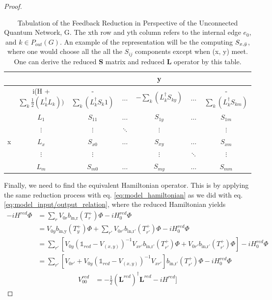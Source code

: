 \documentclass[a4paper]{article}
\theoremstyle{definition}
\begin{document}
\begin{enumerate}[label=(\roman*)]
\begin{proof}
\begin{table}[H]
    \centering
    \begin{tabular}{c|c c c|c|c c}
         & & & & y & & \\ \hline
         & i(H + $\sum_k \frac{1}{2}(L_k^\dagger L_k))$ & -$\sum_k (L_k^\dagger {S_k1})$ & $\dots$ & $-\sum_k (L_k^\dagger S_{ky})$ & $\dots$ & -$\sum_k (L_k^\dagger S_{km})$ \\
         & $L_1$ & $S_{11}$ & $\dots$ & $S_{1y}$ & $\dots$ & $S_{1m}$ \\
          & $\vdots $ & $\vdots $ & $\ddots $ & $\vdots$ & & $\vdots$ \\ \hline
         x  & $L_x$ & $S_{x0}$ & $\dots$ & $S_{xy}$ & $\dots$ & $S_{xm}$ \\ \hline
            & $\vdots$ &  $\vdots$ & &  $\vdots $& $\ddots$ & $\vdots$ \\
            & $L_m$ & $S_{m0}$ & $\dots$ & $S_{my}$ & $\dots$ & $S_{mm}$
    \end{tabular}
    \caption{Tabulation of the Feedback Reduction in Perspective of the Unconnected Quantum Network, G. The xth row and yth column refers to the internal edge $e_0$, and $k \in P_{out}(G)$. An example of the representation will be the computing $S_{x,\Bar{y}}$, where one would choose all the all the $S_{ij}$ components except when (x, y) meet. One can derive the reduced \textbf{S} matrix and reduced \textbf{L} operator by this table.}
    \label{tab:reduced_model_matrix_table}
\end{table}

Finally, we need to find the equivalent Hamiltonian operator. This is by applying the same reduction process with eq. \ref{eq:model_hamiltonian} as we did with eq. \ref{eq:model_input/output_relation}, where the reduced Hamiltonian yields 
\begin{align}
    -iH^{red}\Phi & = \sum_r V_{0r} b_{\text{in,r}}(T^+_r) \Phi - iH_0^{red} \Phi \nonumber \\
   & = V_{0y} b_{\text{in,y}}(T^+_y) \Phi + \sum_{r'} V_{0r'} b_{\text{in,r'}}(T^+_{r'}) \Phi - iH_0^{red} \Phi \nonumber \\
    & = \sum_{r'} [V_{0y} (\mathbb{1}_{red}-V_{(x,y)})^{-1}V_{xr'}b_{\text{in,r'}}(T^+_{r'})\Phi + V_{0r'} b_{\text{in,r'}}(T^+_{r'}) \Phi] - iH_0^{red} \Phi \nonumber \\
    & =  \sum_{r'} [V_{0r'} + V_{0y} (\mathbb{1}_{red}-V_{(x,y)})^{-1} V_{xr'} ] b_{\text{in,r'}}(T^+_{r'}) \Phi - iH_0^{red} \Phi \nonumber 
\end{align}
\begin{align*}
    V^{red}_{00} & =  -\frac{1}{2}(\textbf{L}^{red})^\dagger \textbf{L}^{red} - iH^{red} ]
\end{align*}
  


\end{proof}
\end{enumerate}
\end{document}

